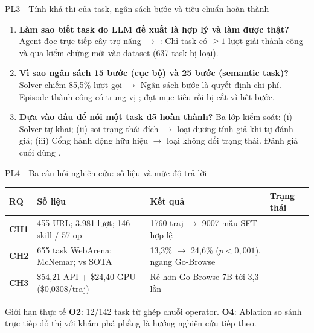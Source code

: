 \begin{frame}{PL3 - Tính khả thi của task, ngân sách bước và tiêu chuẩn hoàn thành}
  \begin{enumerate}\setlength{\itemsep}{3pt}
    \item \textbf{Làm sao biết task do LLM đề xuất là hợp lý và làm được thật?} \newline
      Agent đọc trực tiếp cây trợ năng $\rightarrow$ : Chỉ task có $\ge 1$ lượt giải thành công và qua kiểm chứng mới vào dataset (637 task bị loại).
    \item \textbf{Vì sao ngân sách 15 bước (cục bộ) và 25 bước (semantic task)?} \newline
      Solver chiếm 85,5\% lượt gọi $\rightarrow$ Ngân sách bước là quyết định chi phí. Episode thành công có trung vị ;  đạt mục tiêu rồi bị cắt vì hết bước.
    \item \textbf{Dựa vào đâu để nói một task đã hoàn thành?} \newline
      Ba lớp kiểm soát: (i) Solver tự khai; (ii)  soi trạng thái đích $\rightarrow$ loại  dương tính giả khi tự đánh giá; (iii) Cổng hành động hữu hiệu $\rightarrow$ loại  không đổi trạng thái. Đánh giá cuối dùng .
  \end{enumerate}
\end{frame}


\begin{frame}{PL4 - Ba câu hỏi nghiên cứu: số liệu và mức độ trả lời}
  \centering
  \setlength{\tabcolsep}{1.5pt}
  \renewcommand{\arraystretch}{0.95}
  \begin{tabular}{@{}L{0.8cm} L{4.6cm} L{4.8cm} L{1.4cm}@{}}
    \toprule
    \textbf{RQ} & \textbf{Số liệu} & \textbf{Kết quả} & \textbf{Trạng thái} \\
    \midrule
    \textbf{CH1} & 455 URL; 3.981 lượt; 146 skill / 57 op & 1760 traj $\rightarrow$ 9007 mẫu SFT hợp lệ &  \\
    \textbf{CH2} & 655 task WebArena; McNemar; vs SOTA & 13,3\% $\rightarrow$ 24,6\% ($p < 0{,}001$), ngang Go-Browse &  \\
    \textbf{CH3} & \$54,21 API + \$24,40 GPU (\$0,0308/traj) & Rẻ hơn Go-Browse-7B tới 3,3 lần &  \\
    \bottomrule
  \end{tabular}

  \vspace{0.04cm}
  \raggedright
  \begin{block}{Giới hạn thực tế}
    \textbf{O2}: 12/142 task từ ghép chuỗi operator. \textbf{O4}: Ablation so sánh trực tiếp đồ thị với khám phá phẳng là hướng nghiên cứu tiếp theo.
  \end{block}
\end{frame}

